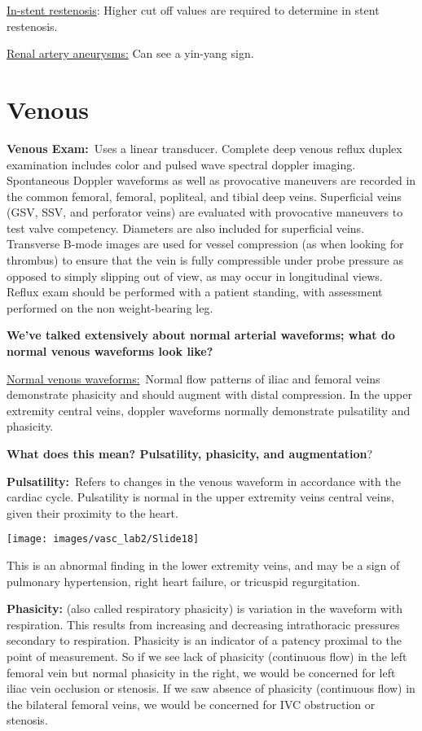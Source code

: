 \documentclass[
]{book}
\begin{document}
\uline{In-stent restenosis}: Higher cut off values are required to
determine in stent restenosis.\citep{chi2009, schäberle2016}

\uline{Renal artery aneurysms:} Can see a yin-yang sign.
\citep{gutta2008, ham2014}

\hypertarget{venous}{%
\section{Venous}\label{venous}}

\textbf{Venous Exam:}~Uses a linear transducer. Complete deep venous reflux
duplex examination includes color and pulsed wave spectral doppler
imaging. Spontaneous Doppler waveforms as well as provocative maneuvers
are recorded in the common femoral, femoral, popliteal, and tibial deep
veins. Superficial veins (GSV, SSV, and perforator veins) are evaluated
with provocative maneuvers to test valve competency. Diameters are also
included for superficial veins. Transverse B-mode images are used for
vessel compression (as when looking for thrombus) to ensure that the
vein is fully compressible under probe pressure as opposed to simply
slipping out of view, as may occur in longitudinal views. Reflux exam
should be performed with a patient standing, with assessment performed
on the non weight-bearing leg.

\textbf{We've talked extensively about normal arterial waveforms; what do
normal venous waveforms look like?}

\uline{Normal venous waveforms:}~Normal flow patterns of iliac and
femoral veins demonstrate phasicity and should augment with distal
compression. In the upper extremity central veins, doppler waveforms
normally demonstrate pulsatility and phasicity.

\textbf{What does this mean? Pulsatility, phasicity, and augmentation}?

\textbf{Pulsatility:}~Refers to changes in the venous waveform in accordance
with the cardiac cycle. Pulsatility is normal in the upper extremity
veins central veins, given their proximity to the heart.

\texttt{[image: images/vasc\_lab2/Slide18]}

This is an abnormal finding in the lower extremity veins, and may be a
sign of pulmonary hypertension, right heart failure, or tricuspid
regurgitation.

\textbf{Phasicity:} (also called respiratory phasicity) is variation in the
waveform with respiration. This results from increasing and decreasing
intrathoracic pressures secondary to respiration. Phasicity is an
indicator of a patency proximal to the point of measurement. So if we
see lack of phasicity (continuous flow) in the left femoral vein but
normal phasicity in the right, we would be concerned for left iliac vein
occlusion or stenosis. If we saw absence of phasicity (continuous flow)
in the bilateral femoral veins, we would be concerned for IVC
obstruction or stenosis.
\end{document}
